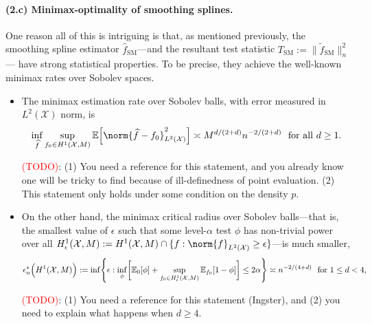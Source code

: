 \documentclass{article}
\newcommand{\1}{\mathbf{1}}
\newcommand{\Xset}{\mathcal{X}}
\newcommand{\Leb}{L}
\newcommand{\Ebb}{\mathbb{E}}
\newcommand{\wt}[1]{\widetilde{#1}}
\newcommand{\wh}[1]{\widehat{#1}}
\newcommand{\SM}{\mathrm{SM}}
\theoremstyle{alden}
\theoremstyle{aldenthm}
\theoremstyle{definition}
\theoremstyle{remark}
\begin{document}
\paragraph{(2.c) Minimax-optimality of smoothing splines.} 
One reason all of this is intriguing is that, as mentioned previously, the smoothing spline estimator $\wh{f}_{\SM}$---and the resultant test statistic $T_{\SM} := \|\wt{f}_{\SM}\|_n^2$--- have strong statistical properties. To be precise, they achieve the well-known minimax rates over Sobolev spaces.
\begin{itemize}
	\item  The minimax estimation rate over Sobolev balls, with error measured in $\Leb^2(\Xset)$ norm, is 
	\begin{equation}
	\label{eqn:sobolev_space_estimation_minimax_rate}
	\inf_{\wh{f}} \sup_{f_0 \in H^1(\Xset, M)} \Ebb\Bigl[\norm{\wh{f} - f_0}_{L^2(\Xset)}^2\Bigr] \asymp M^{d/(2 + d)}n^{-2/(2 + d)}~~\textrm{for all $d \geq 1$.}
	\end{equation}
	
	\textcolor{red}{(TODO)}: (1) You need a reference for this statement, and you already know one will be tricky to find because of ill-definedness of point evaluation. (2) This statement only holds under some condition on the density $p$.
	 
	\item On the other hand, the minimax critical radius over Sobolev balls---that is, the smallest value of $\epsilon$ such that some level-${\alpha}$ test $\phi$ has non-trivial power over all $H_{\epsilon}^1(\Xset,M) := H^1(\Xset,M) \cap \{f: \norm{f}_{\Leb^2(\Xset)} \geq \epsilon\}$---is much smaller, 
	\begin{equation}
	\label{eqn:sobolev_space_testing_critical_radius}
	\epsilon_n^{\star}\Bigl(H^1(\Xset,M)\Bigr):= \inf\Biggl\{\epsilon: \inf_{\phi} \biggl[\Ebb_0[\phi] +  \sup_{f_0 \in H_{\epsilon}^1(\Xset,M)} \Ebb_{f_0}[1 - \phi]\biggr] \leq 2\alpha \Biggr\} \asymp n^{-2/(4 + d)}~~\textrm{for $1 \leq d < 4$,}
	\end{equation}
	
	\textcolor{red}{(TODO)}: (1) You need a reference for this statement (Ingster), and (2) you need to explain what happens when $d \geq 4$.
	

\end{itemize}
\end{document}
